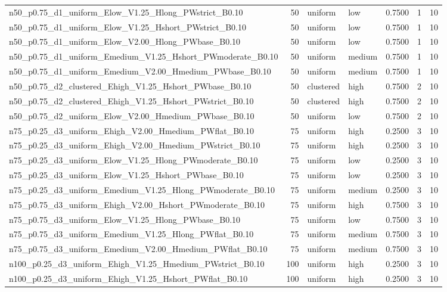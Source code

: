 \begin{tabular}{lrllrrr}
n50_p0.75_d1_uniform_Elow_V1.25_Hlong_PWstrict_B0.10 & 50 & uniform & low & 0.7500 & 1 & 10 \\
n50_p0.75_d1_uniform_Elow_V1.25_Hshort_PWstrict_B0.10 & 50 & uniform & low & 0.7500 & 1 & 10 \\
n50_p0.75_d1_uniform_Elow_V2.00_Hlong_PWbase_B0.10 & 50 & uniform & low & 0.7500 & 1 & 10 \\
n50_p0.75_d1_uniform_Emedium_V1.25_Hshort_PWmoderate_B0.10 & 50 & uniform & medium & 0.7500 & 1 & 10 \\
n50_p0.75_d1_uniform_Emedium_V2.00_Hmedium_PWbase_B0.10 & 50 & uniform & medium & 0.7500 & 1 & 10 \\
n50_p0.75_d2_clustered_Ehigh_V1.25_Hshort_PWbase_B0.10 & 50 & clustered & high & 0.7500 & 2 & 10 \\
n50_p0.75_d2_clustered_Ehigh_V1.25_Hshort_PWstrict_B0.10 & 50 & clustered & high & 0.7500 & 2 & 10 \\
n50_p0.75_d2_uniform_Elow_V2.00_Hmedium_PWbase_B0.10 & 50 & uniform & low & 0.7500 & 2 & 10 \\
n75_p0.25_d3_uniform_Ehigh_V2.00_Hmedium_PWflat_B0.10 & 75 & uniform & high & 0.2500 & 3 & 10 \\
n75_p0.25_d3_uniform_Ehigh_V2.00_Hmedium_PWstrict_B0.10 & 75 & uniform & high & 0.2500 & 3 & 10 \\
n75_p0.25_d3_uniform_Elow_V1.25_Hlong_PWmoderate_B0.10 & 75 & uniform & low & 0.2500 & 3 & 10 \\
n75_p0.25_d3_uniform_Elow_V1.25_Hshort_PWbase_B0.10 & 75 & uniform & low & 0.2500 & 3 & 10 \\
n75_p0.25_d3_uniform_Emedium_V1.25_Hlong_PWmoderate_B0.10 & 75 & uniform & medium & 0.2500 & 3 & 10 \\
n75_p0.75_d3_uniform_Ehigh_V2.00_Hshort_PWmoderate_B0.10 & 75 & uniform & high & 0.7500 & 3 & 10 \\
n75_p0.75_d3_uniform_Elow_V1.25_Hlong_PWbase_B0.10 & 75 & uniform & low & 0.7500 & 3 & 10 \\
n75_p0.75_d3_uniform_Emedium_V1.25_Hlong_PWflat_B0.10 & 75 & uniform & medium & 0.7500 & 3 & 10 \\
n75_p0.75_d3_uniform_Emedium_V2.00_Hmedium_PWflat_B0.10 & 75 & uniform & medium & 0.7500 & 3 & 10 \\
n100_p0.25_d3_uniform_Ehigh_V1.25_Hmedium_PWstrict_B0.10 & 100 & uniform & high & 0.2500 & 3 & 10 \\
n100_p0.25_d3_uniform_Ehigh_V1.25_Hshort_PWflat_B0.10 & 100 & uniform & high & 0.2500 & 3 & 10 \\

\end{tabular}
